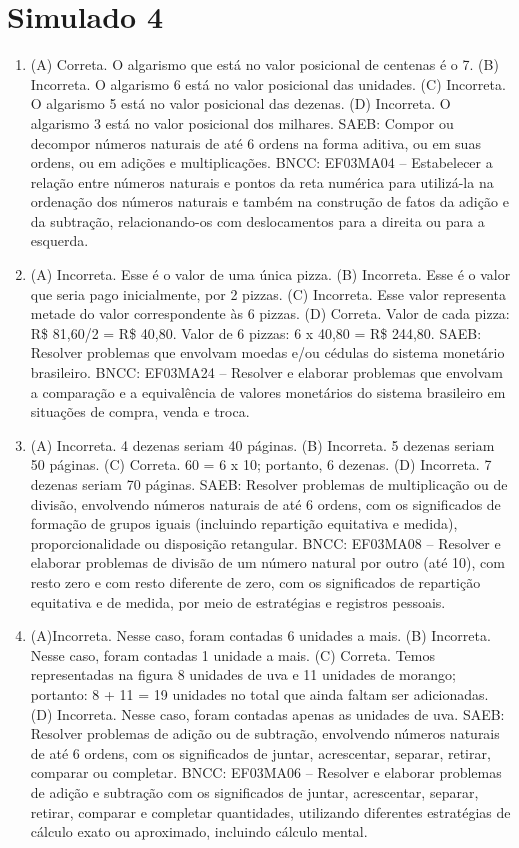 \section*{Simulado 4}

\begin{enumerate}
\item
(A) Correta. O algarismo que está no valor posicional de centenas é o 7.
(B) Incorreta. O algarismo 6 está no valor posicional das unidades.
(C) Incorreta. O algarismo 5 está no valor posicional das dezenas.
(D) Incorreta. O algarismo 3 está no valor posicional dos milhares.
SAEB: Compor ou decompor números naturais de até 6 ordens na forma aditiva, ou em suas ordens, ou em adições e multiplicações.
BNCC: EF03MA04 -- Estabelecer a relação entre números naturais e pontos da reta numérica para
utilizá-la na ordenação dos números naturais e também na construção de fatos da adição e da
subtração, relacionando-os com deslocamentos para a direita ou para a esquerda.

\item
(A) Incorreta. Esse é o valor de uma única pizza.
(B) Incorreta. Esse é o valor que seria pago inicialmente, por 2 pizzas.
(C) Incorreta. Esse valor representa metade do valor correspondente às 6 pizzas.
(D) Correta. Valor de cada pizza: R\$ 81,60/2 = R\$ 40,80. Valor de 6 pizzas: 6 x 40,80 = R\$ 244,80.
SAEB: Resolver problemas que envolvam moedas e/ou cédulas do sistema monetário brasileiro.
BNCC: EF03MA24 -- Resolver e elaborar problemas que envolvam a comparação e a equivalência de
valores monetários do sistema brasileiro em situações de compra, venda e troca.

\item
(A) Incorreta. 4 dezenas seriam 40 páginas.
(B) Incorreta. 5 dezenas seriam 50 páginas.
(C) Correta. 60 = 6 x 10; portanto, 6 dezenas.
(D) Incorreta. 7 dezenas seriam 70 páginas.
SAEB: Resolver problemas de multiplicação ou de divisão, envolvendo números naturais de até 6 ordens, com os significados de formação de grupos iguais (incluindo repartição equitativa e medida),
proporcionalidade ou disposição retangular.
BNCC: EF03MA08 -- Resolver e elaborar problemas de divisão de um número natural por outro (até
10), com resto zero e com resto diferente de zero, com os significados de repartição equitativa
e de medida, por meio de estratégias e registros pessoais.

\item
(A)Incorreta. Nesse caso, foram contadas 6 unidades a mais.
(B) Incorreta. Nesse caso, foram contadas 1 unidade a mais.
(C) Correta. Temos representadas na figura 8 unidades de uva e 11 unidades de morango; portanto: 8 + 11 = 19 unidades no total que ainda faltam ser adicionadas.
(D) Incorreta. Nesse caso, foram contadas apenas as unidades de uva.
SAEB: Resolver problemas de adição ou de subtração,
envolvendo números naturais de até 6 ordens, com os significados de
juntar, acrescentar, separar, retirar, comparar ou completar.
BNCC: EF03MA06 – Resolver e elaborar problemas de adição e subtração com os significados de
juntar, acrescentar, separar, retirar, comparar e completar quantidades, utilizando diferentes
estratégias de cálculo exato ou aproximado, incluindo cálculo mental.


\end{enumerate}
